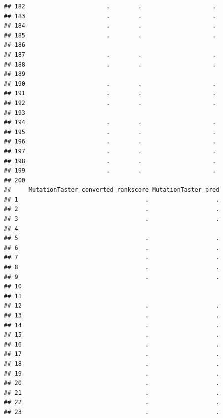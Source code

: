 \documentclass[
]{article}
\begin{document}
\begin{verbatim}
## 182                       .        .                    .
## 183                       .        .                    .
## 184                       .        .                    .
## 185                       .        .                    .
## 186                                                      
## 187                       .        .                    .
## 188                       .        .                    .
## 189                                                      
## 190                       .        .                    .
## 191                       .        .                    .
## 192                       .        .                    .
## 193                                                      
## 194                       .        .                    .
## 195                       .        .                    .
## 196                       .        .                    .
## 197                       .        .                    .
## 198                       .        .                    .
## 199                       .        .                    .
## 200                                                      
##     MutationTaster_converted_rankscore MutationTaster_pred
## 1                                    .                   .
## 2                                    .                   .
## 3                                    .                   .
## 4                                                         
## 5                                    .                   .
## 6                                    .                   .
## 7                                    .                   .
## 8                                    .                   .
## 9                                    .                   .
## 10                                                        
## 11                                                        
## 12                                   .                   .
## 13                                   .                   .
## 14                                   .                   .
## 15                                   .                   .
## 16                                   .                   .
## 17                                   .                   .
## 18                                   .                   .
## 19                                   .                   .
## 20                                   .                   .
## 21                                   .                   .
## 22                                   .                   .
## 23                                   .                   .

\end{verbatim}
\end{document}
